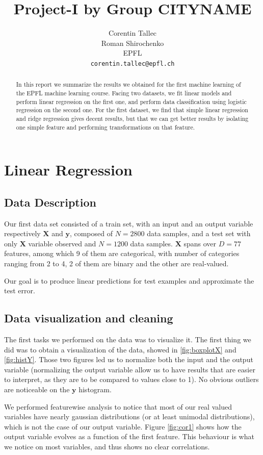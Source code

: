 \documentclass{article} %
\title{Project-I by Group CITYNAME}
\author{
Corentin Tallec\\
Roman Shirochenko\\
EPFL \\
\texttt{corentin.tallec@epfl.ch} \\
}
\begin{document}
\maketitle

\begin{abstract}
	In this report we summarize the results we obtained for the first machine
	learning of the EPFL machine learning course. Facing two datasets, we fit
	linear models and perform linear regression on the first one, and perform data
	classification using logistic regression on the second one. For the first
	dataset, we find that simple linear regression and ridge regression gives
	decent results, but that we can get better results by isolating one simple
	feature and performing transformations on that feature.
\end{abstract}

\section{Linear Regression}
\subsection{Data Description}
Our first data set consisted of a train set, with an input and an output
variable respectively $\mathbf{X}$ and $\mathbf{y}$, composed of $N=2800$ data
samples, and a test set with only $\mathbf{X}$ variable observed and $N=1200$
data samples. $\mathbf{X}$ spans over $D=77$ features, among which 9 of them are
categorical, with number of categories ranging from 2 to 4, 2 of them are binary
and the other are real-valued.

Our goal is to produce linear predictions for test examples and approximate the
test error.

\subsection{Data visualization and cleaning}
The first tasks we performed on the data was to visualize it. The first thing we
did was to obtain a visualization of the data, showed in \ref{fig:boxplotX} and
\ref{fig:histY}. Those two figures led us to normalize both the input and the
output variable (normalizing the output variable allow us to have results that are
easier to interpret, as they are to be compared to values close to 1). No
obvious outliers are noticeable on the $\mathbf{y}$ histogram.

We performed featurewise analysis to notice that most of our real valued
variables have nearly gaussian distributions (or at least unimodal
distributions), which is not the case of our output variable. Figure
\ref{fig:cor1} shows how the output variable evolves as a function of the first
feature. This behaviour is what we notice on most variables, and thus shows no
clear correlations.
\end{document}

